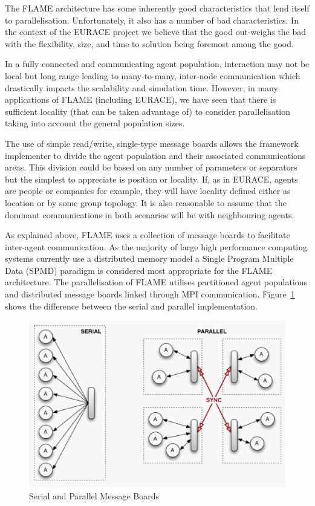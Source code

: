 The FLAME architecture has some inherently good characteristics that lend itself to parallelisation. Unfortunately, it also has a number of bad characteristics. In the context of the EURACE project we believe that the good out-weighs the bad with the flexibility, size, and time to solution being foremost among the good. 

In a fully connected and communicating agent population, interaction may not be local but long range leading to many-to-many, inter-node communication which drastically impacts the scalability and simulation time. However, in many applications of FLAME (including EURACE), we have seen that there is sufficient locality (that can be taken advantage of) to consider parallelisation taking into account the general population sizes. 

The use of simple read/write, single-type message boards allows the framework implementer to divide the agent population and their associated communications areas. This division could be based on any number of parameters or separators but the simplest to appreciate is position or locality. If, as in EURACE, agents are people or companies for example, they will have locality defined either as location or by some group topology. It is also reasonable to assume that the dominant communications in both scenarios will be with neighbouring agents.

As explained above, FLAME uses a collection of message boards to facilitate inter-agent communication. As the majority of large high performance computing systems currently use a distributed memory model a Single Program Multiple Data (SPMD) paradigm is considered most appropriate for the FLAME architecture. The parallelisation of FLAME utilises partitioned agent populations and distributed message boards linked through MPI communication. Figure~\ref{fig:Figure2} shows the difference between the serial and parallel implementation.

\begin{figure}[h]
	\centering
		\includegraphics[scale=0.25]{flame.jpg}
	\caption{Serial and Parallel Message Boards}
	\label{fig:Figure2}
\end{figure}

